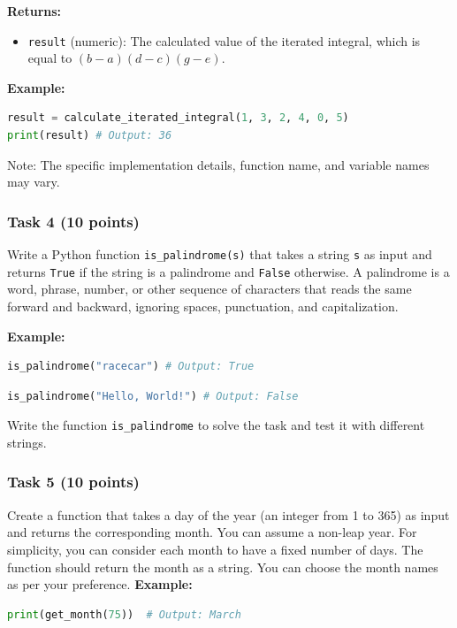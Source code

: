\documentclass[12pt]{book}
\begin{document}
\textbf{Returns:}
\begin{itemize}
\item \texttt{result} (numeric): The calculated value of the iterated integral, which is equal to $(b - a)(d - c)(g - e)$.
\end{itemize}

\textbf{Example:}
\begin{lstlisting}[language=Python]
result = calculate_iterated_integral(1, 3, 2, 4, 0, 5)
print(result) # Output: 36
\end{lstlisting}

Note: The specific implementation details, function name, and variable names may vary.


\subsubsection{Task 4 (10 points)}
Write a Python function \texttt{is\_palindrome(s)} that takes a string \texttt{s} as input and returns \texttt{True} if the string is a palindrome and \texttt{False} otherwise. A palindrome is a word, phrase, number, or other sequence of characters that reads the same forward and backward, ignoring spaces, punctuation, and capitalization.

\textbf{Example:}
\begin{lstlisting}[language=Python]
is_palindrome("racecar") # Output: True
\end{lstlisting}


\begin{lstlisting}[language=Python]
is_palindrome("Hello, World!") # Output: False
\end{lstlisting}


Write the function \texttt{is\_palindrome} to solve the task and test it with different strings.



\subsubsection{Task 5 (10 points)}
Create a function that takes a day of the year (an integer from 1 to 365) as input and returns the corresponding month. You can assume a non-leap year. For simplicity, you can consider each month to have a fixed number of days. The function should return the month as a string. You can choose the month names as per your preference.
\textbf{Example:}
\begin{lstlisting}[language=Python]
print(get_month(75))  # Output: March
\end{lstlisting}
\end{document}
